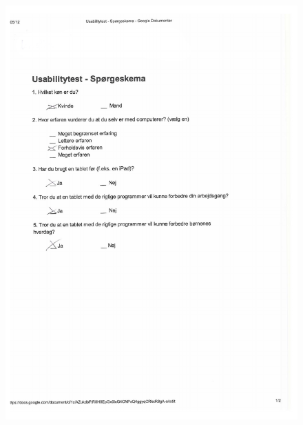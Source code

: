\begin{figure}
	\centering
		\includegraphics{input/appendices/demo_k1.pdf}
	\label{fig:demo_t}
\end{figure}

